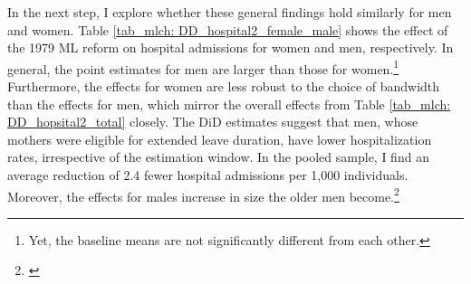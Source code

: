 

 

In the next step, I explore whether these general findings hold similarly for men and women. Table \ref{tab_mlch: DD_hospital2_female_male} shows the effect of the 1979 ML reform on hospital admissions for women and men, respectively. In general, the point estimates for men are larger than those for women.\footnote{Yet, the baseline means are not significantly different from each other.} Furthermore, the effects for women are less robust to the choice of bandwidth than the effects for men, which mirror the overall effects from Table \ref{tab_mlch: DD_hopsital2_total} closely. The DiD estimates suggest that men, whose mothers were eligible for extended leave duration, have lower hospitalization rates, irrespective of the estimation window. In the pooled sample, I find an average reduction of 2.4 fewer hospital admissions per 1,000 individuals. Moreover, the effects for males increase in size the older men become.\footnote{ \label{rev_mlch: editor_interaction_TxA_agegroups}} 


